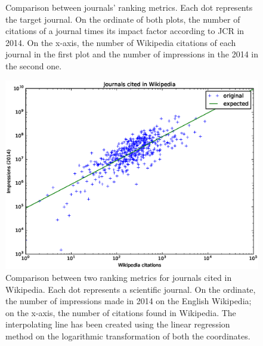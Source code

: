 \begin{figure}[h]
\begin{subfigure}{1\textwidth}
\label{fig:journals_compare_impressions2014}
    \end{subfigure}
    \caption{Comparison between journals' ranking metrics. Each dot represents the target journal.
    On the ordinate of both plots, the number of citations of a journal times its impact factor according to JCR in 2014.
    On the x-axis, the number of Wikipedia citations of each journal in the first plot and the number of impressions in the 2014 in the second one.}
\label{fig:journals_compare}
\end{figure}

\begin{figure}[h]
\centering
\includegraphics[keepaspectratio=true, width=\textwidth]{assets/journals_appearances_impressions_loglog}
\caption{Comparison between two ranking metrics for journals cited in Wikipedia.
Each dot represents a scientific journal.
On the ordinate, the number of impressions made in 2014 on the English Wikipedia;
on the x-axis, the number of citations found in Wikipedia.
The interpolating line has been created using the linear regression method on the logarithmic transformation of both the coordinates.}
\label{fig:journals_appearances_impressions_loglog}
\end{figure}


